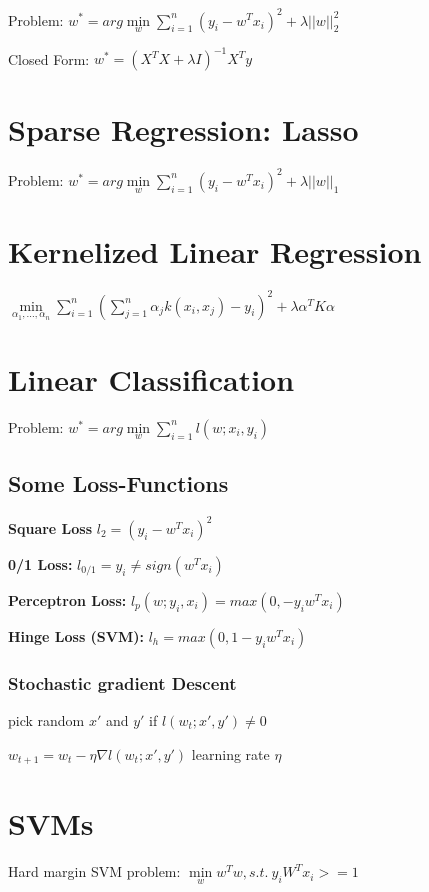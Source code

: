 \documentclass[11pt,twocolumn]{article}
\begin{document}
Problem: $ w^* =  arg \min \limits_w \sum \limits_{i=1}^n \left(y_i - w^Tx_i\right)^2 + \lambda ||w||_2^2$

Closed Form: $w^* = \left(X^T X + \lambda I \right)^{-1} X^T y$

\section{Sparse Regression: Lasso}

Problem: $ w^* =  arg \min \limits_w \sum \limits_{i=1}^n \left(y_i - w^Tx_i\right)^2 + \lambda ||w||_1$


\section{Kernelized Linear Regression}

$\min \limits_{\alpha_1,...,\alpha_n} \sum \limits_{i=1}^n\left( \sum \limits_{j=1}^n \alpha_j k(x_i,x_j) - y_i \right)^2 + \lambda \alpha^T K \alpha$

\section{Linear Classification}

Problem: $ w^* =  arg \min \limits_w \sum \limits_{i=1}^n l\left(w;x_i,y_i\right)$


\subsection{Some Loss-Functions}
\textbf{Square Loss} $l_2 = (y_i - w^T x_i)^2$

\textbf{0/1 Loss:} $ l_{0/1}  =  y_i \neq sign(w^Tx_i)$

\textbf{Perceptron Loss:} $l_p\left(w;y_i,x_i \right) =   max(0, -y_i w^T x_i)$

\textbf{Hinge Loss (SVM):} $l_h =   max(0, 1 -y_i w^T x_i)$

\subsubsection{Stochastic gradient Descent}
pick random $x'$ and $y'$
if $ l(w_t;x',y') \neq 0$

$w_{t+1} = w_{t} - \eta \nabla l(w_t;x', y') $  learning rate $\eta$



\section{SVMs}
Hard margin SVM problem: $\min \limits_w w^Tw , s.t.~ y_i W^T x_i >= 1$
\end{document}
